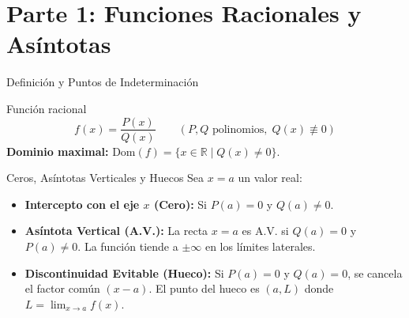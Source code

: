 \documentclass[aspectratio=169]{beamer}
\begin{document}
\begin{frame}[plain]
  \titlepage
\end{frame}

\section{Parte 1: Funciones Racionales y Asíntotas}


\begin{frame}{Definición y Puntos de Indeterminación}
  \begin{block}{Función racional}
    $$f(x) = \frac{P(x)}{Q(x)} \qquad (P, Q \text{ polinomios}, \; Q(x) \not\equiv 0)$$
    \textbf{Dominio maximal:} $\text{Dom}(f) = \{x \in \mathbb{R} \mid Q(x) \neq 0\}$.
  \end{block}

  \vspace{4pt}
  \begin{block}{Ceros, Asíntotas Verticales y Huecos}
    Sea $x = a$ un valor real:
    \begin{itemize}
      \item \textbf{Intercepto con el eje $x$ (Cero):} Si $P(a) = 0$ y $Q(a) \neq 0$.
      \item \textbf{Asíntota Vertical (A.V.):} La recta $x = a$ es A.V. si $Q(a) = 0$ y $P(a) \neq 0$. La función tiende a $\pm\infty$ en los límites laterales.
      \item \textbf{Discontinuidad Evitable (Hueco):} Si $P(a) = 0$ y $Q(a) = 0$, se cancela el factor común $(x - a)$. El punto del hueco es $(a, L)$ donde $L = \lim_{x \to a} f(x)$.
    \end{itemize}
  \end{block}
\end{frame}
\end{document}

